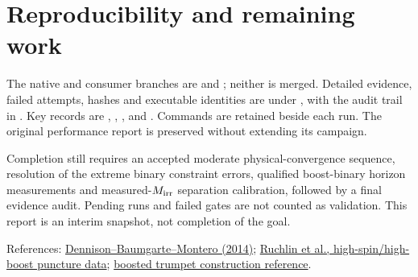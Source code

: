 \documentclass[aps,prd,preprint,notitlepage,nofootinbib]{revtex4-2}
\begin{document}
\section{Reproducibility and remaining work}
The native and consumer branches are  and
; neither is merged. Detailed evidence, failed
attempts, hashes and executable identities are under ,
with the audit trail in . Key records are
, ,
, and .
Commands are retained beside each run. The original performance report is
preserved without extending its campaign.

Completion still requires an accepted moderate physical-convergence sequence,
resolution of the extreme binary constraint errors, qualified boost-binary
horizon measurements and measured-$M_{\rm irr}$ separation calibration, followed
by a final evidence audit. Pending runs and failed gates are not counted as
validation. This report is an interim snapshot, not completion of the goal.

\smallskip\noindent References:
\href{https://arxiv.org/abs/1409.1887}{Dennison--Baumgarte--Montero (2014)};
\href{https://arxiv.org/abs/1410.8607}{Ruchlin et al., high-spin/high-boost puncture data};
\href{https://arxiv.org/abs/1806.08364}{boosted trumpet construction reference}.
\end{document}
